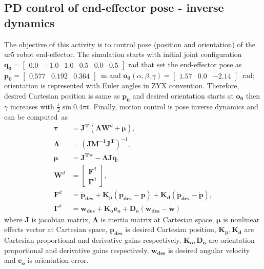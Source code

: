 \graphicspath{{images/act_3.6/}}
\setcounter{subsection}{5}
\subsection{PD control of end-effector pose - inverse dynamics}
The objective of this activity is to control pose (position and orientation) of the ur5 robot end-effector. The simulation starts with initial joint configuration $\mathbf{q_0}=\begin{bmatrix} 0.0 & -1.0 & 1.0 & 0.5 & 0.0 & 0.5 \end{bmatrix}$ rad that set the end-effector pose as $\mathbf{p_0}=\begin{bmatrix}  0.577 &   0.192 &   0.364 \end{bmatrix}$~m and $\mathbf{o_0}(\alpha, \beta, \gamma)= \begin{bmatrix} 1.57 & 0.0 & -2.14 \end{bmatrix}$~rad; orientation is represented with Euler angles in ZYX convention. Therefore, desired Cartesian position is same as $\mathbf{p_0}$ and desired orientation starts at $\mathbf{o_0}$ then $\gamma$ increases with $\frac{\pi}{2}\sin{0.4\pi t}$. Finally, motion control is pose inverse dynamics and can be computed~as 
\begin{align}
	\boldsymbol{\tau} &= \mathbf{J^T} (\boldsymbol{\Lambda}\mathbf{W}^{d} + \boldsymbol{\mu}), \label{eq:pose_idyn}
	\\
	\boldsymbol{\Lambda} &= (\mathbf{J M^{-1} J^{T}})^{-1}, 
	\nonumber \\
	\boldsymbol{\mu} &= \mathbf{J^{T\#}} - \boldsymbol{\Lambda}\mathbf{\dot{J}\dot{q}}, 
	\nonumber \\	
	\mathbf{W}^{d} &=
	\begin{bmatrix}
	\mathbf{F}^{d} \\ \boldsymbol{\Gamma}^{d}
	\end{bmatrix}, 
	\nonumber \\
	\mathbf{F}^{d} &= \mathbf{\ddot{p}_{des}} + \mathbf{K_p (p_{des}-p)} + \mathbf{K_d (\dot{p}_{des}-\dot{p})}, 
	\nonumber \\
	\boldsymbol{\Gamma}^{d} &= \mathbf{\dot{w}_{des}} + \mathbf{K_o e_o} + \mathbf{D_o (\dot{w}_{des}-\dot{w})} \nonumber
\end{align}
\noindent where $\mathbf{J}$ is jacobian matrix, $\boldsymbol{\Lambda}$ is inertia matrix at Cartesian space, $\boldsymbol{\mu}$ is nonlinear effects vector at Cartesian space, $\mathbf{p_{des}}$ is desired Cartesian position, $\mathbf{K_p, K_d}$ are Cartesian proportional and derivative gains respectively, $\mathbf{K_o, D_o}$ are orientation proportional and derivative gains respectively, $\mathbf{w_{des}}$ is desired angular velocity and $\mathbf{e_o}$ is orientation error. \vspace{.5cm}


